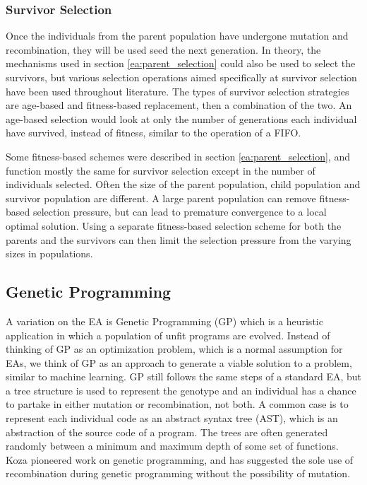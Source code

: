 \documentclass[conference]{IEEEtran}
\begin{document}
{\subsubsection{Survivor Selection}
\label{ea:survivor_selection}
\par Once the individuals from the parent population have undergone mutation and recombination, they will be used seed the next generation.
In theory, the mechanisms used in section \ref{ea:parent_selection} could also be used to select the survivors, but various selection operations aimed specifically at survivor selection have been used throughout literature.
The types of survivor selection strategies are age-based and fitness-based replacement, then a combination of the two. 
An age-based selection would look at only the number of generations each individual have survived, instead of fitness, similar to the operation of a FIFO.

\par Some fitness-based schemes were described in section \ref{ea:parent_selection}, and function mostly the same for survivor selection except in the number of individuals selected.
Often the size of the parent population, child population and survivor population are different.
A large parent population can remove fitness-based selection pressure, but can lead to premature convergence to a local optimal solution. 
Using a separate fitness-based selection scheme for both the parents and the survivors can then limit the selection pressure from the varying sizes in populations.

\subsection{Genetic Programming}
\par A variation on the EA is Genetic Programming (GP) which is a heuristic application in which a population of unfit programs are evolved. 
Instead of thinking of GP as an optimization problem, which is a normal assumption for EAs, we think of GP as an approach to generate a viable solution to a problem, similar to machine learning\cite{eiben2003introduction}.
GP still follows the same steps of a standard EA, but a tree structure is used to represent the genotype and an individual has a chance to partake in either mutation or recombination, not both. 
A common case is to represent each individual code as an abstract syntax tree (AST), which is an abstraction of the source code of a program.
The trees are often generated randomly between a minimum and maximum depth of some set of functions.
Koza\cite{koza1992genetic} pioneered work on genetic programming, and has suggested the sole use of recombination during genetic programming without the possibility of mutation.

}
\end{document}
